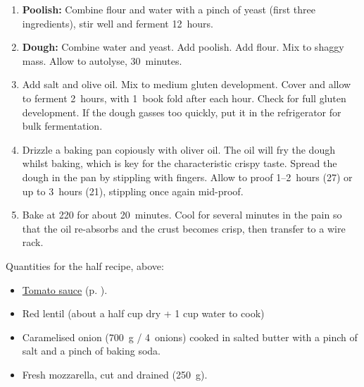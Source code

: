 \begin{recipe}
  \begin{enumerate}

  \item \textbf{Poolish:} Combine flour and water with a pinch of
    yeast (first three ingredients), stir well and ferment 12~hours.

  \item \textbf{Dough:} Combine water and yeast.  Add poolish.  Add
    flour.  Mix to shaggy mass.  Allow to autolyse, 30~minutes.

  \item Add salt and olive oil.  Mix to medium gluten development.
    Cover and allow to ferment 2\fracH~hours, with 1~book fold after
    each hour.  Check for full gluten development.  If the dough
    gasses too quickly, put it in the refrigerator for bulk fermentation.

  \item Drizzle a baking pan copiously with oliver oil.  The oil will
    fry the dough whilst baking, which is key for the characteristic
    crispy taste.  Spread the dough in the pan by stippling with
    fingers.  Allow to proof 1\fracH--2~hours (27\degreeC) or up to
    3~hours (21\degreeC), stippling once again mid-proof.

  \item Bake at 220\degreeC{} for about 20~minutes.  Cool for several
    minutes in the pain so that the oil re-absorbs and the crust
    becomes crisp, then transfer to a wire rack.

  \end{enumerate}
\end{recipe}


Quantities for the half recipe, above:
\begin{itemize}
\item \hyperref[tomato.sauce]{Tomato sauce} (p. \pageref{tomato.sauce}).
\item Red lentil (about a half cup dry + 1 cup water to cook)
\item Caramelised onion (700~g / 4~onions) cooked in salted butter
  with a pinch of salt and a pinch of baking soda.
\item Fresh mozzarella, cut and drained (250~g).
\end{itemize}

%
